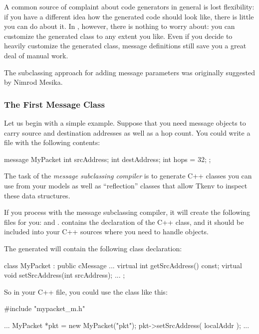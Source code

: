 A common source of complaint about code generators in general is
lost flexibility: if you have a different idea how the generated
code should look like, there is little you can do about it.
In {\opp}, however, there is nothing to worry about: you can
customize the generated class to any extent you like.
Even if you decide to heavily customize the generated class,
message definitions still save you a great deal of manual work.

The subclassing approach for adding message parameters was originally
suggested by Nimrod Mesika.


\subsubsection{The First Message Class}

Let us begin with a simple example. Suppose that you need message objects to
carry source and destination addresses as well as a hop count. You could write
a  file with the following contents:


\begin{msg}
message MyPacket
{
     int srcAddress;
     int destAddress;
     int hops = 32;
};
\end{msg}

The task of the \textit{message subclassing compiler} is to generate C++ classes
you can use from your models as well as ``reflection'' classes that allow
Tkenv to inspect these data structures.

If you process  with the message subclassing compiler, it will
create the following files for you:  and .
 contains the declaration of the  C++ class, and
it should be included into your C++ sources where you need to handle
 objects.

The generated  will contain the following class declaration:

\begin{cpp}
class MyPacket : public cMessage {
    ...
    virtual int getSrcAddress() const;
    virtual void setSrcAddress(int srcAddress);
    ...
};
\end{cpp}

So in your C++ file, you could use the  class like this:

\begin{cpp}
#include "mypacket_m.h"

...
MyPacket *pkt = new MyPacket("pkt");
pkt->setSrcAddress( localAddr );
...
\end{cpp}

